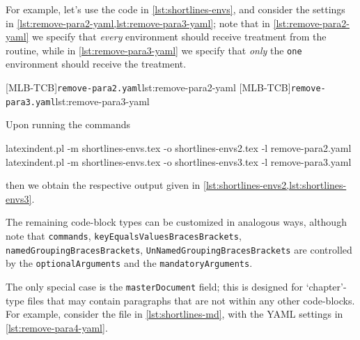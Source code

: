 	For example, let's use the code in \cref{lst:shortlines-envs}, and consider the settings
	in \cref{lst:remove-para2-yaml,lst:remove-para3-yaml}; note that in \cref{lst:remove-para2-yaml} we specify that
	\emph{every} environment should receive treatment from the routine, while
	in \cref{lst:remove-para3-yaml} we specify that \emph{only} the
	\texttt{one} environment should receive the treatment.

	\begin{minipage}{.45\linewidth}
	\end{minipage}
	\hfill
	\begin{minipage}{.49\linewidth}
		[MLB-TCB]{\texttt{remove-para2.yaml}}{lst:remove-para2-yaml}
		[MLB-TCB]{\texttt{remove-para3.yaml}}{lst:remove-para3-yaml}
	\end{minipage}

	Upon running the commands
	\begin{widepage}
		\begin{commandshell}
latexindent.pl -m shortlines-envs.tex -o shortlines-envs2.tex -l remove-para2.yaml
latexindent.pl -m shortlines-envs.tex -o shortlines-envs3.tex -l remove-para3.yaml
\end{commandshell}
	\end{widepage}
	then we obtain the respective output given in \cref{lst:shortlines-envs2,lst:shortlines-envs3}.


	The remaining code-block types can be customized in analogous ways, although note that
	\texttt{commands}, \texttt{keyEqualsValuesBracesBrackets}, \texttt{namedGroupingBracesBrackets},
	\texttt{UnNamedGroupingBracesBrackets} are controlled by the \texttt{optionalArguments} and the
	\texttt{mandatoryArguments}.

	The only special case is the \texttt{masterDocument} field; this is designed for
	`chapter'-type files that may contain paragraphs that are not within any other
	code-blocks. For example, consider the file in \cref{lst:shortlines-md}, with the YAML
	settings in \cref{lst:remove-para4-yaml}.

